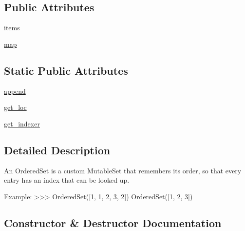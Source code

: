 \subsection*{Public Attributes}
\begin{DoxyCompactItemize}
\item 
\hyperlink{classsetuptools_1_1__vendor_1_1ordered__set_1_1OrderedSet_a6d741070b722b7a36c674968ee914375}{items}
\item 
\hyperlink{classsetuptools_1_1__vendor_1_1ordered__set_1_1OrderedSet_abd970a68e639bbc245c8df1ec24ffd0d}{map}
\end{DoxyCompactItemize}
\subsection*{Static Public Attributes}
\begin{DoxyCompactItemize}
\item 
\hyperlink{classsetuptools_1_1__vendor_1_1ordered__set_1_1OrderedSet_a419d31dd95bde499f054de84010b03f5}{append}
\item 
\hyperlink{classsetuptools_1_1__vendor_1_1ordered__set_1_1OrderedSet_a78343f5c1897edfa05772a0cb9be1a34}{get\+\_\+loc}
\item 
\hyperlink{classsetuptools_1_1__vendor_1_1ordered__set_1_1OrderedSet_a9a761f62dd6e7caee0390e2049c1a2bf}{get\+\_\+indexer}
\end{DoxyCompactItemize}


\subsection{Detailed Description}
\begin{DoxyVerb}An OrderedSet is a custom MutableSet that remembers its order, so that
every entry has an index that can be looked up.

Example:
    >>> OrderedSet([1, 1, 2, 3, 2])
    OrderedSet([1, 2, 3])
\end{DoxyVerb}
 

\subsection{Constructor \& Destructor Documentation}
\mbox{\label{classsetuptools_1_1__vendor_1_1ordered__set_1_1OrderedSet_a6449b2239a895bbf87203d5f23dc2548}} 
